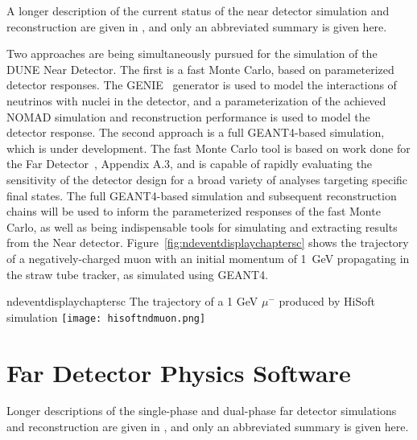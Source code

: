 A longer description of the current status of the near detector simulation and reconstruction are given
in \anxreco, and only an abbreviated summary is given here.

Two approaches are being simultaneously pursued for the simulation of the DUNE Near Detector.  The first is a fast Monte Carlo,
based on parameterized detector responses. The GENIE~\cite{GENIE} generator is used to model the interactions of neutrinos
with nuclei in the detector, and a parameterization of the achieved NOMAD simulation and reconstruction performance is used to
model the detector response.
The second approach is a full GEANT4-based simulation, which is under development.  The fast Monte Carlo tool is based on work done for
the Far Detector~\cite{Adams:2013qkq}, Appendix A.3, and is capable of rapidly evaluating the sensitivity of the detector
design for a broad variety of analyses targeting specific final states.   The full GEANT4-based simulation and subsequent reconstruction
chains will be used to inform the parameterized responses of the fast Monte Carlo, as well as being indispensable tools for simulating
and extracting results from the Near detector.  Figure~\ref{fig:ndeventdisplaychaptersc} shows the trajectory of a
negatively-charged muon with an initial momentum of 1~GeV propagating in the straw tube tracker, as simulated using GEANT4.

\begin{cdrfigure}{ndeventdisplaychaptersc}
{The trajectory of a 1 GeV $\mu^-$ produced by HiSoft simulation}
\texttt{[image: hisoftndmuon.png]}
\end{cdrfigure}

\section{Far Detector Physics Software}
\label{sec:detectors-sc-physics-software}

Longer descriptions of the single-phase and dual-phase far detector simulations and reconstruction are given
in \anxreco, and only an abbreviated summary is given here.

%

